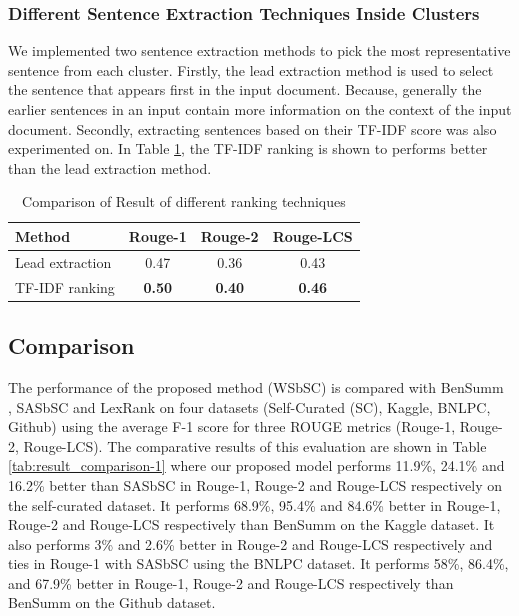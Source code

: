 \documentclass[acmlarge]{acmart}
\begin{document}
\subsubsection{Different Sentence Extraction Techniques Inside Clusters} \label{subsubsec:different-ranking-techniques-inside-clusters}
We implemented two sentence extraction methods to pick the most representative sentence from each cluster. Firstly, the lead extraction method is used to select the sentence that appears first in the input document. Because, generally the earlier sentences in an input contain more information on the context of the input document. Secondly, extracting sentences based on their TF-IDF score was also experimented on. In Table \ref{tab:ranking}, the TF-IDF ranking is shown to performs better than the lead extraction method.
\begin{table}[h]
	\centering
	\begin{tabular}{lccc}\hline
		Method      	& Rouge-1       & Rouge-2       & Rouge-LCS     \\\hline
		Lead extraction	& 0.47          & 0.36          & 0.43          \\
		TF-IDF ranking	& \textbf{0.50} & \textbf{0.40} & \textbf{0.46} \\\hline
	\end{tabular}
	\caption{Comparison of Result of different ranking techniques}
	\label{tab:ranking}
\end{table}
\subsection{Comparison}\label{subsec:comparison}
The performance of the proposed method (WSbSC) is compared with BenSumm \cite{chowdhury-etal-2021-tfidf-clustering}, SASbSC \cite{roychowdhury-etal-2022-spectral-base} and LexRank \cite{Erkan-lexRank-2004} on four datasets (Self-Curated (SC), Kaggle, BNLPC, Github) using the average F-1 score for three ROUGE metrics (Rouge-1, Rouge-2, Rouge-LCS). The comparative results of this evaluation are shown in Table \ref{tab:result_comparison-1} where our proposed model performs 11.9\%, 24.1\% and 16.2\% better than SASbSC in Rouge-1, Rouge-2 and Rouge-LCS respectively on the self-curated dataset. It performs 68.9\%, 95.4\% and 84.6\% better in Rouge-1, Rouge-2 and Rouge-LCS respectively than BenSumm on the Kaggle dataset. It also performs 3\% and 2.6\% better in Rouge-2 and Rouge-LCS respectively and ties in Rouge-1 with SASbSC using the BNLPC dataset. It performs 58\%, 86.4\%, and 67.9\% better in Rouge-1, Rouge-2 and Rouge-LCS respectively than BenSumm on the Github dataset.\\
\end{document}
